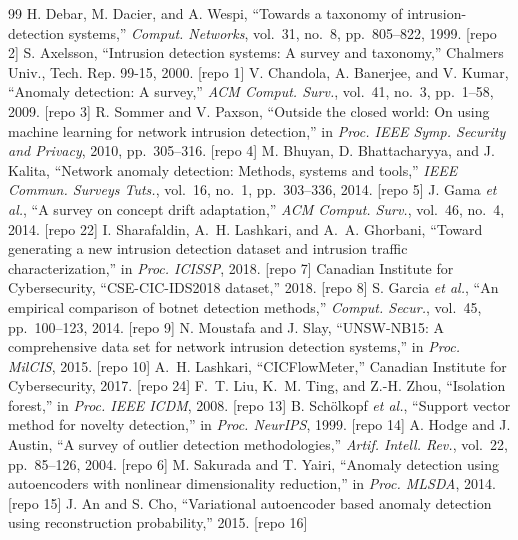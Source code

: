 \documentclass[conference]{IEEEtran}
\begin{document}
\begin{thebibliography}{99}
 H. Debar, M. Dacier, and A. Wespi, ``Towards a taxonomy of intrusion-detection systems,'' \textit{Comput. Networks}, vol.~31, no.~8, pp.~805--822, 1999. [repo 2]
 S. Axelsson, ``Intrusion detection systems: A survey and taxonomy,'' Chalmers Univ., Tech. Rep. 99-15, 2000. [repo 1]
 V. Chandola, A. Banerjee, and V. Kumar, ``Anomaly detection: A survey,'' \textit{ACM Comput. Surv.}, vol.~41, no.~3, pp.~1--58, 2009. [repo 3]
 R. Sommer and V. Paxson, ``Outside the closed world: On using machine learning for network intrusion detection,'' in \textit{Proc. IEEE Symp. Security and Privacy}, 2010, pp.~305--316. [repo 4]
 M. Bhuyan, D. Bhattacharyya, and J. Kalita, ``Network anomaly detection: Methods, systems and tools,'' \textit{IEEE Commun. Surveys Tuts.}, vol.~16, no.~1, pp.~303--336, 2014. [repo 5]
 J. Gama \textit{et al.}, ``A survey on concept drift adaptation,'' \textit{ACM Comput. Surv.}, vol.~46, no.~4, 2014. [repo 22]
 I. Sharafaldin, A.~H. Lashkari, and A.~A. Ghorbani, ``Toward generating a new intrusion detection dataset and intrusion traffic characterization,'' in \textit{Proc. ICISSP}, 2018. [repo 7]
 Canadian Institute for Cybersecurity, ``CSE-CIC-IDS2018 dataset,'' 2018. [repo 8]
 S. Garcia \textit{et al.}, ``An empirical comparison of botnet detection methods,'' \textit{Comput. Secur.}, vol.~45, pp.~100--123, 2014. [repo 9]
 N. Moustafa and J. Slay, ``UNSW-NB15: A comprehensive data set for network intrusion detection systems,'' in \textit{Proc. MilCIS}, 2015. [repo 10]
 A.~H. Lashkari, ``CICFlowMeter,'' Canadian Institute for Cybersecurity, 2017. [repo 24]
 F.~T. Liu, K.~M. Ting, and Z.-H. Zhou, ``Isolation forest,'' in \textit{Proc. IEEE ICDM}, 2008. [repo 13]
 B. Sch\"olkopf \textit{et al.}, ``Support vector method for novelty detection,'' in \textit{Proc. NeurIPS}, 1999. [repo 14]
 A. Hodge and J. Austin, ``A survey of outlier detection methodologies,'' \textit{Artif. Intell. Rev.}, vol.~22, pp.~85--126, 2004. [repo 6]
 M. Sakurada and T. Yairi, ``Anomaly detection using autoencoders with nonlinear dimensionality reduction,'' in \textit{Proc. MLSDA}, 2014. [repo 15]
 J. An and S. Cho, ``Variational autoencoder based anomaly detection using reconstruction probability,'' 2015. [repo 16]

\end{thebibliography}
\end{document}
